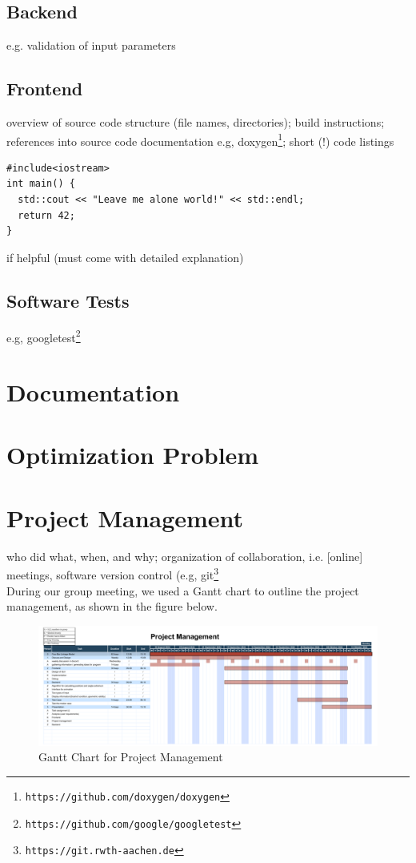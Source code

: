 \documentclass{article}
\begin{document}
\subsection{Backend}
e.g. validation of input parameters

\subsection{Frontend}

overview of source code structure (file names, directories); build instructions; references into source code documentation e.g, doxygen\footnote{\tt https://github.com/doxygen/doxygen}; short (!) code listings
\begin{lstlisting}
#include<iostream>
int main() {
  std::cout << "Leave me alone world!" << std::endl;
  return 42;
}
\end{lstlisting}
if helpful (must come with detailed explanation)

\subsection{Software Tests}

e.g, googletest\footnote{\tt https://github.com/google/googletest}

\section{Documentation}\label{ch:doc}

\section{Optimization Problem}\label{ch:optimization-problem}



\section{Project Management} \label{ch:projectmanagement}

who did what, when, and why; organization of collaboration, i.e. [online] meetings, software version control (e.g, git\footnote{\tt https://git.rwth-aachen.de}\\

During our group meeting, we used a Gantt chart to outline the project management, as shown in the figure below.  

\begin{figure}[h]
	\centering
	\includegraphics[width=\textwidth]{./figures/project_management_gantt_chart.pdf}
	\caption{Gantt Chart for Project Management}
	\label{fig:project_management_gantt_chart}
\end{figure}
\end{document}
